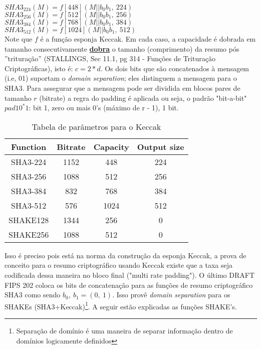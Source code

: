 \documentclass[12pt, a4paper]{article}
\begin{document}
\begin{enumerate}
\begin{enumerate}
\begin{enumerate}
$SHA3_{224}(M) = f[448](M || b_{0}b_{1},\ 224)$\\

$SHA3_{256}(M) = f[512](M || b_{0}b_{1},\ 256)$\\

$SHA3_{384}(M) = f[768](M || b_{0}b_{1},\ 384)$\\

$SHA3_{512}(M) = f[1024](M || b_{0}b_{1},\ 512)$\\

Note que $f$ é a função esponja Keccak. Em cada caso, a capacidade é dobrada em
tamanho consecutivamente \underline{\textbf{dobra}} o tamanho (comprimento) da
resumo pós ''trituração'' (STALLINGS, Sec 11.1, pg 314 - Funções de Trituração
Criptográficas), isto é: $c = 2*d$. Os dois bits que são concatenados à mensagem
(i.e, 01) suportam o \textit{domain separation}; eles distinguem a mensagem para
o SHA3. Para assegurar que a mensagem pode ser dividida em blocos pares de
tamanho $r$ (bitrate) a regra do padding é aplicada ou seja, o padrão
"bit-a-bit" $pad10^{*}1$: bit 1, zero ou mais 0's (máximo de r - 1), 1 bit.\\

\begin{table}[ht!]
  \centering
  \begin{tabular}{|c|c|c|c|}
    \hline Function & Bitrate & Capacity & Output size \\
    \hline SHA3-224 & 1152 & 448 & 224 \\
    \hline SHA3-256 & 1088 & 512 & 256 \\
    \hline SHA3-384 & 832 & 768 & 384 \\
    \hline SHA3-512 & 576 & 1024 & 512 \\
    \hline SHAKE128 & 1344 & 256 & 0 \\
    \hline SHAKE256 & 1088 & 512 & 0 \\
    \hline
  \end{tabular}
  \caption{Tabela de parâmetros para o Keccak}
\end{table}

Isso é preciso pois está na norma da construção da esponja Keccak, a prova de
conceito para o resumo criptográfico usando Keccak existe que a taxa seja
codificada dessa maneira no bloco final ("multi rate padding"). O último DRAFT
FIPS 202 coloca os bits de concatenação para as funções de resumo criptográfico
SHA3 como sendo $b_{0},\ b_{1} = (0,\ 1)$. Isso provê \textit{domain separation}
para os SHAKEs (SHA3+Keccak)\footnote{Separação de domínio é uma maneira de
separar informação dentro de domínios logicamente definidos}. A seguir estão
explicadas as funções SHAKE's.\\


\end{enumerate}
\end{enumerate}
\end{enumerate}
\end{document}
